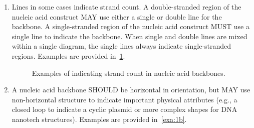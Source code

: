 \begin{enumerate}
\item Lines in some cases indicate strand count. 
	A double-stranded region of the nucleic acid construct MAY use either a single or double line for the backbone.  
	A single-stranded region of the nucleic acid construct MUST use a single line to indicate the backbone.
	When single and double lines are mixed within a single diagram, the single lines always indicate single-stranded regions.
	Examples are provided in~\ref{exa:1a}.
	
	\begin{figure}[h!]
	\centering
	\caption{Examples of indicating strand count in nucleic acid backbones.}
	\label{exa:1a}
	\end{figure}
		
\item A nucleic acid backbone SHOULD be horizontal in orientation, 
	but MAY use non-horizontal structure to indicate important physical attributes 
	(e.g., a closed loop to indicate a cyclic plasmid or more complex shapes for DNA nanotech structures).   
	Examples are provided in~\ref{exa:1b}.
	

\end{enumerate}

